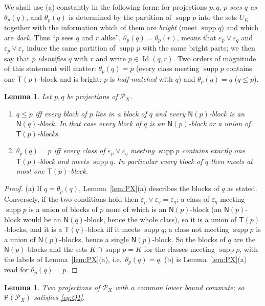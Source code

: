 \documentclass[11pt]{amsart}
\newtheorem{lemma}[theorem]{Lemma}
\theoremstyle{definition}
\renewcommand{\P}{\mathcal{P}}      %
\newcommand{\PA}{\mathsf{P}}         %
\newcommand{\supp}{\operatorname{supp}}
\newcommand{\T}{\mathsf{T}}
\newcommand{\N}{\mathsf{N}}
\newcommand{\Id}{\operatorname{Id}}
\begin{document}
We shall use (a) constantly in the following form: for projections $p,q$, \emph{$p$ sees $q$ as} $\theta_p(q)$, and $\theta_p(q)$ is determined by the partition of $\supp p$ into the sets $U_K$ together with the information which of them are \emph{bright} (meet $\supp q$) and which are \emph{dark}. Thus ``$p$ sees $q$ and $r$ alike'', $\theta_p(q)=\theta_p(r)$, means that $\varepsilon_p\vee\varepsilon_q$ and $\varepsilon_p\vee\varepsilon_r$ induce the same partition of $\supp p$ with the same bright parts; we then say that $p$ \emph{identifies} $q$ with $r$ and write $p\in\Id(q,r)$. Two orders of magnitude of this statement will matter: $\theta_p(q)=p$ (every class meeting $\supp p$ contains one $\T(p)$-block and is bright: $p$ is \emph{half-matched} with $q$) and $\theta_p(q)=q$ ($q\le p$).

\begin{lemma}\label{lem:order}
Let $p,q$ be projections of $\P_X$.
\begin{enumerate}[label=\textup{(\alph*)}]
\item $q\le p$ iff every block of $p$ lies in a block of $q$ and every $\N(p)$-block is an $\N(q)$-block. In that case every block of $q$ is an $\N(p)$-block or a union of $\T(p)$-blocks.
\item $\theta_p(q)=p$ iff every class of $\varepsilon_p\vee\varepsilon_q$ meeting $\supp p$ contains exactly one $\T(p)$-block and meets $\supp q$. In particular every block of $q$ then meets at most one $\T(p)$-block.
\end{enumerate}
\end{lemma}

\begin{proof}
(a) If $q=\theta_p(q)$, Lemma~\ref{lem:PX}(a) describes the blocks of $q$ as stated. Conversely, if the two conditions hold then $\varepsilon_p\vee\varepsilon_q=\varepsilon_q$; a class of $\varepsilon_q$ meeting $\supp p$ is a union of blocks of $p$ none of which is an $\N(p)$-block (an $\N(p)$-block would be an $\N(q)$-block, hence the whole class), so it is a union of $\T(p)$-blocks, and it is a $\T(q)$-block iff it meets $\supp q$; a class not meeting $\supp p$ is a union of $\N(p)$-blocks, hence a single $\N(p)$-block. So the blocks of $q$ are the $\N(p)$-blocks and the sets $K\cap\supp p=K$ for the classes meeting $\supp p$, with the labels of Lemma~\ref{lem:PX}(a), i.e.\ $\theta_p(q)=q$. (b) is Lemma~\ref{lem:PX}(a) read for $\theta_p(q)=p$.
\end{proof}

\begin{lemma}\label{lem:PCinPX}
Two projections of $\P_X$ with a common lower bound commute; so $\PA(\P_X)$ satisfies \eqref{eq:Q1}.
\end{lemma}
\end{document}
